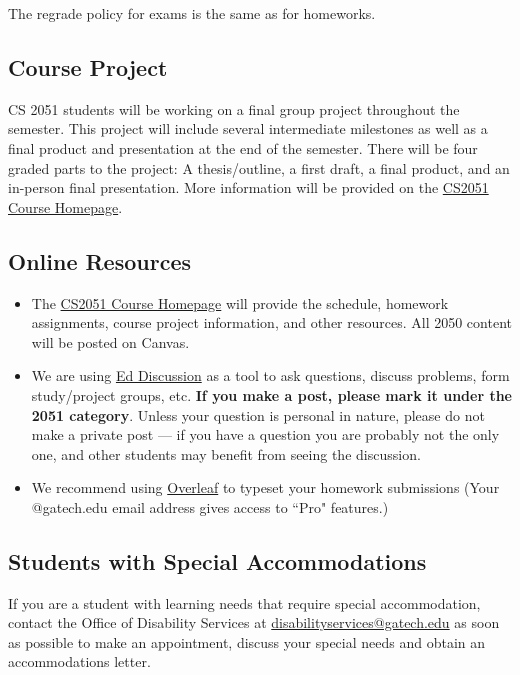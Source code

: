 \documentclass{article}
\begin{document}
    \vspace{3mm}
    The regrade policy for exams is the same as for homeworks.

\subsection*{Course Project}
    CS 2051 students will be working on a final group project throughout the semester. This project will include several intermediate milestones as well as a final product and presentation at the end of the semester. There will be four graded parts to the project: A thesis/outline, a first draft, a final product, and an in-person final presentation. More information will be provided on the \href{https://github.com/sar-mo/CS2051-HonorsDiscreteMath}{CS2051 Course Homepage}.

\subsection*{Online Resources}
    \begin{itemize}
        \item The \href{https://github.com/sar-mo/CS2051-HonorsDiscreteMath}{CS2051 Course Homepage} will provide the schedule, homework assignments, course project information, and other resources. All 2050 content will be posted on Canvas.
        \item We are using \href{https://edstem.org/}{Ed Discussion} as a tool to ask questions, discuss problems, form study/project groups, etc. \textbf{If you make a post, please mark it under the 2051 category}. Unless your question is personal in nature, please do not make a private post — if you have a question you are probably not the only one, and other students may benefit from seeing the discussion.
        \item We recommend using \href{https://overleaf.com}{Overleaf} to typeset your homework submissions (Your @gatech.edu email address gives access to ``Pro" features.)
    \end{itemize}

\subsection*{Students with Special Accommodations}
If you are a student with learning needs that require special accommodation, contact the Office of Disability Services at \url{disabilityservices@gatech.edu} as soon as possible to make an appointment, discuss your special needs and obtain an accommodations letter.
\end{document}
